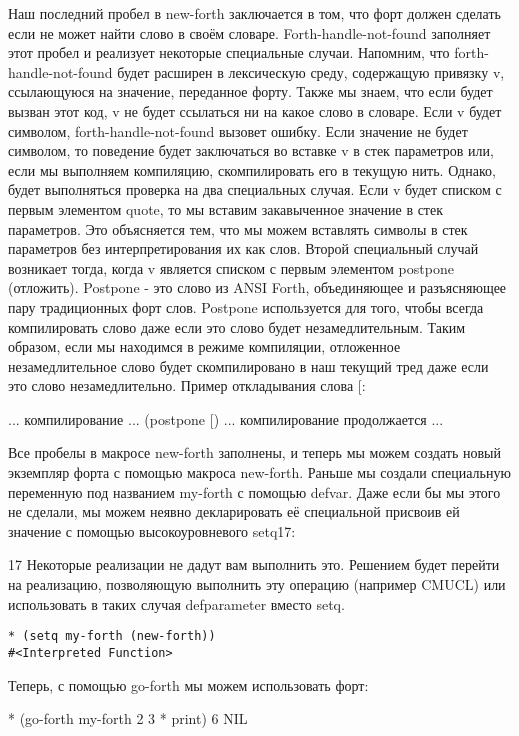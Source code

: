Наш последний пробел в new-forth заключается в том, что форт должен сделать если не может найти слово в своём словаре. Forth-handle-not-found заполняет этот пробел и реализует некоторые специальные случаи. Напомним, что forth-handle-not-found будет расширен в лексическую среду, содержащую привязку v, ссылающуюся на значение, переданное форту. Также мы знаем, что если будет вызван этот код, v не будет ссылаться ни на какое слово в словаре. Если v будет символом, forth-handle-not-found вызовет ошибку. Если значение не будет символом, то поведение будет заключаться во вставке v в стек параметров или, если мы выполняем компиляцию, скомпилировать его в текущую нить. Однако, будет выполняться проверка на два специальных случая. Если v будет списком с первым элементом quote, то мы вставим закавыченное значение в стек параметров. Это объясняется тем, что мы можем вставлять символы в стек параметров без интерпретирования их как слов. Второй специальный случай возникает тогда, когда v является списком с первым элементом postpone (отложить). Postpone - это слово из ANSI Forth, объединяющее и разъясняющее пару традиционных форт слов. Postpone используется для того, чтобы всегда компилировать слово даже если это слово будет незамедлительным. Таким образом, если мы находимся в режиме компиляции, отложенное незамедлительное слово будет скомпилировано в наш текущий тред даже если это слово незамедлительно. Пример откладывания слова [:

... компилирование ...
(postpone [)
... компилирование продолжается ...

Все пробелы в макросе new-forth заполнены, и теперь мы можем создать новый экземпляр форта с помощью макроса new-forth. Раньше мы создали специальную переменную под названием my-forth с помощью defvar. Даже если бы мы этого не сделали, мы можем неявно декларировать её специальной присвоив ей значение с помощью высокоуровневого setq17:

17 Некоторые реализации не дадут вам выполнить это. Решением будет перейти на реализацию, позволяющую выполнить эту операцию (например CMUCL) или использовать в таких случая defparameter вместо setq.

\begin{verbatim}
* (setq my-forth (new-forth))
#<Interpreted Function>
\end{verbatim}

Теперь, с помощью go-forth мы можем использовать форт:

* (go-forth my-forth
2 3 * print)
6
NIL

